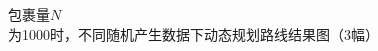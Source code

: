 \documentclass[twocolumn]{jbuaa}
\begin{document}
\begin{figure}[!h]
{\begin{minipage}{5cm}
		\end{minipage}}
		\caption{包裹量$N$为1000时，不同随机产生数据下动态规划路线结果图（3幅）} 
		\label{fig:3}                                          %

	\end{figure}
\end{document}
